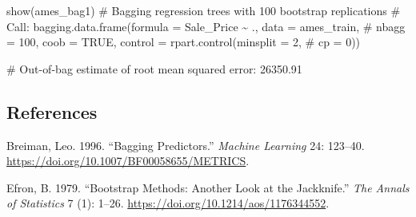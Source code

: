 \documentclass[
  letterpaper,
  DIV=11,
  numbers=noendperiod]{scrartcl}
\newenvironment{Shaded}{\begin{snugshade}}{\end{snugshade}}
\newcommand{\CommentTok}[1]{\textcolor[rgb]{0.37,0.37,0.37}{#1}}
\newcommand{\FunctionTok}[1]{\textcolor[rgb]{0.28,0.35,0.67}{#1}}
\newcommand{\NormalTok}[1]{\textcolor[rgb]{0.00,0.23,0.31}{#1}}
\newlength{\cslhangindent}
\newlength{\cslentryspacingunit} %
\newenvironment{CSLReferences}[2] %
 {%
  \setlength{\parindent}{0pt}
  \ifodd #1
  \let\oldpar\par
  \def\par{\hangindent=\cslhangindent\oldpar}
  \fi
  \setlength{\parskip}{#2\cslentryspacingunit}
 }%
 {}
\begin{document}
\begin{Shaded}
\begin{Highlighting}[]
\FunctionTok{show}\NormalTok{(ames\_bag1)}
\CommentTok{\# Bagging regression trees with 100 bootstrap replications }
\CommentTok{\# Call: bagging.data.frame(formula = Sale\_Price \textasciitilde{} ., data = ames\_train, }
\CommentTok{\#    nbagg = 100, coob = TRUE, control = rpart.control(minsplit = 2, }
\CommentTok{\#        cp = 0))}

\CommentTok{\# Out{-}of{-}bag estimate of root mean squared error:  26350.91 }
\end{Highlighting}
\end{Shaded}

\hypertarget{references}{%
\subsection*{References}\label{references}}

\hypertarget{refs}{}
\begin{CSLReferences}{1}{0}
\leavevmode{}%
Breiman, Leo. 1996. {``Bagging Predictors.''} \emph{Machine Learning}
24: 123--40. \url{https://doi.org/10.1007/BF00058655/METRICS}.

\leavevmode{}%
Efron, B. 1979. {``{Bootstrap Methods: Another Look at the
Jackknife}.''} \emph{The Annals of Statistics} 7 (1): 1--26.
\url{https://doi.org/10.1214/aos/1176344552}.

\end{CSLReferences}
\end{document}
